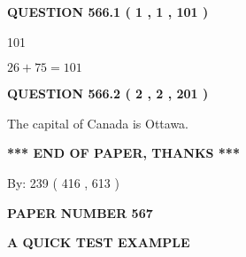\documentclass[12pt]{article}
\begin{document}
{\textbf{\Large{QUESTION
566.1 
 ( 1 , 1 , 101 )
}}}
  
  
 
 
\noindent{}

101
 
 
 
 
\noindent{}

$ %
26 +  %
75=   %
101$
 
 
  
\vspace{0.2in}
  
{\textbf{\Large{QUESTION
566.2 
 ( 2 , 2 , 201 )
}}}
  
  
 
 
\noindent{}
 
 
The capital of Canada is Ottawa.
 
 
 
 
   
   
 \vspace{0.2in}
 
   
   
   
   
\vspace{1.0in} 
{\textbf{\large{ *** END OF PAPER, THANKS *** }}} 
   
   
\hspace{1.0in} By: 
 239 ( 416 ,  613 )
   
   
   
   
\newpage 
\setcounter{page}{ 
   567001 } 
   
   
   
   
 {\textbf{ \Large{ PAPER NUMBER  567  }}}
   
   
\vspace{0.2in}
   
   
   
   
   
   
 \vspace{0.2in}
{\LARGE {\textbf{ A QUICK TEST EXAMPLE}}}
   
   
   
\vspace{0.2in}
   
\end{document}
